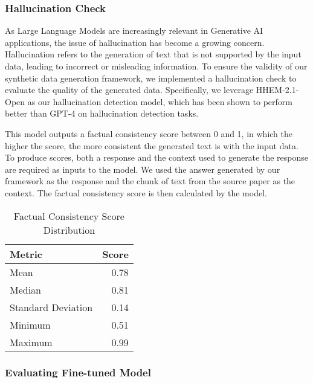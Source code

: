 \subsubsection{Hallucination Check}

As Large Language Models are increasingly relevant in Generative AI applications, the issue of hallucination has become a growing concern.
Hallucination refers to the generation of text that is not supported by the input data, leading to incorrect or misleading information.
To ensure the validity of our synthetic data generation framework, we implemented a hallucination check to evaluate the quality of the generated data.
Specifically, we leverage HHEM-2.1-Open %
as our hallucination detection model, which has been shown to perform better than GPT-4 on hallucination detection tasks.

This model outputs a factual consistency score between 0 and 1, in which the higher the score, the more consistent the generated text is with the input data.
To produce scores, both a response and the context used to generate the response are required as inputs to the model. We used the answer generated by 
our framework as the response and the chunk of text from the source paper as the context. The factual consistency score is then calculated by the model.

\begin{table}[h]
\centering
\caption{Factual Consistency Score Distribution}
\begin{tabular}{lr}
\hline
Metric & Score \\
\hline
Mean & 0.78 \\
Median & 0.81 \\
Standard Deviation & 0.14 \\
Minimum & 0.51 \\
Maximum & 0.99 \\
\hline
\end{tabular}
\label{tab:factual-consistency-scores}
\end{table}

\subsubsection{Evaluating Fine-tuned Model}

